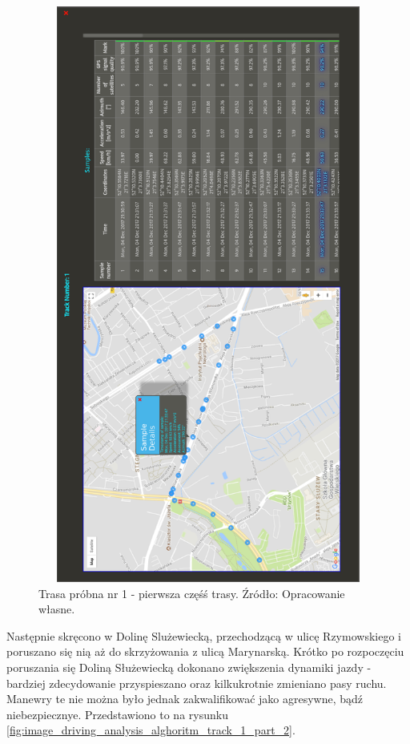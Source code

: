 \begin{figure}[H]
	\centering
	\includegraphics[height=19cm, width=13cm]{img/driving_analysis/test_track_1_lagodna.png}
	\caption{Trasa próbna nr 1 - pierwsza częśś trasy. Źródło: Opracowanie własne.}
	\label{fig:image_driving_analysis_alghoritm_track_1_part_1}
\end{figure}

Następnie skręcono w Dolinę Slużewiecką, przechodzącą w ulicę Rzymowskiego i poruszano się nią aż do skrzyżowania z ulicą Marynarską. Krótko po rozpoczęciu poruszania się Doliną Służewiecką dokonano zwiększenia dynamiki jazdy - bardziej zdecydowanie przyspieszano oraz kilkukrotnie zmieniano pasy ruchu. Manewry te nie można było jednak zakwalifikować jako agresywne, bądź niebezpiecznye. Przedstawiono to na rysunku \ref{fig:image_driving_analysis_alghoritm_track_1_part_2}.

